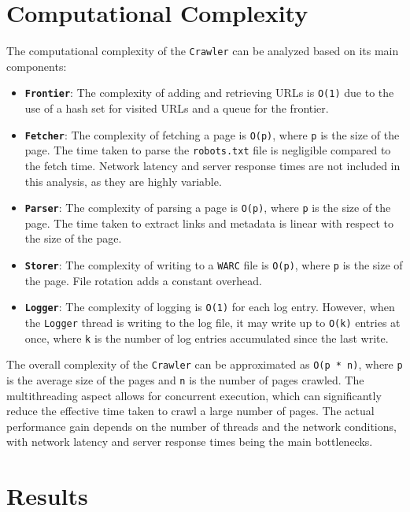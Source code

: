 \documentclass[sigconf]{acmart}
\begin{document}
\section{Computational Complexity}
The computational complexity of the \texttt{Crawler} can be analyzed based on its main components:
\begin{itemize}
  \item \textbf{\texttt{Frontier}}: The complexity of adding and retrieving URLs is \texttt{O(1)} due to the use of a hash set for visited URLs and a queue for the frontier.
  \item \textbf{\texttt{Fetcher}}: The complexity of fetching a page is \texttt{O(p)}, where \texttt{p} is the size of the page. The time taken to parse the \texttt{robots.txt} file is negligible compared to the fetch time. Network latency and server response times are not included in this analysis, as they are highly variable.
  \item \textbf{\texttt{Parser}}: The complexity of parsing a page is \texttt{O(p)}, where \texttt{p} is the size of the page. The time taken to extract links and metadata is linear with respect to the size of the page.
  \item \textbf{\texttt{Storer}}: The complexity of writing to a \texttt{WARC} file is \texttt{O(p)}, where \texttt{p} is the size of the page. File rotation adds a constant overhead.
  \item \textbf{\texttt{Logger}}: The complexity of logging is \texttt{O(1)} for each log entry. However, when the \texttt{Logger} thread is writing to the log file, it may write up to \texttt{O(k)} entries at once, where \texttt{k} is the number of log entries accumulated since the last write. 
\end{itemize}

The overall complexity of the \texttt{Crawler} can be approximated as \texttt{O(p * n)}, where \texttt{p} is the average size of the pages and \texttt{n} is the number of pages crawled. The multithreading aspect allows for concurrent execution, which can significantly reduce the effective time taken to crawl a large number of pages. The actual performance gain depends on the number of threads and the network conditions, with network latency and server response times being the main bottlenecks. 

\section{Results}
\end{document}
